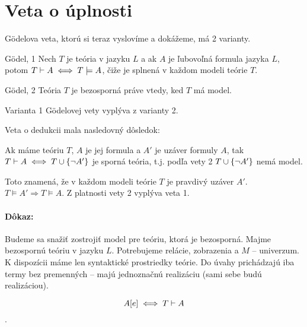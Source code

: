 \section{Veta o úplnosti}
\startFIXME

G\"odelova veta, ktorú si teraz vyslovíme a dokážeme, má 2 varianty.

\begin{veta}{G\"odel, 1}
    Nech $T$ je teória v jazyku $L$ a ak $A$ je
    ľubovoľná formula jazyka $L$, potom $T \vdash A \iff T \models A$,
    čiže je splnená v každom modeli teórie $T$.
\end{veta}

\begin{veta}{G\"odel, 2}
    Teória $T$ je bezosporná práve vtedy, ked $T$ má model.
\end{veta}

\begin{poznamka}
    Varianta 1 G\"odelovej vety vyplýva z varianty 2.

    Veta o dedukcii mala nasledovný dôsledok:

    Ak máme teóriu $T$, $A$ je jej formula a $A'$ je uzáver formuly $A$,
    tak $T \vdash A \iff T \cup \{ \neg A' \}$ je sporná teória,
    t.j. podľa vety 2 $T \cup \{ \neg A' \}$ nemá model.

    Toto znamená, že v každom modeli teórie $T$ je pravdivý uzáver $A'$.
    $T \models A' \Rightarrow T \models A$. Z platnosti vety 2 vyplýva veta 1.
\end{poznamka}

\paragraph{Dôkaz:}

\par Budeme sa snažiť zostrojiť model pre teóriu, ktorá je bezosporná. Majme
bezospornú teóriu v jazyku $L$. Potrebujeme relácie, zobrazenia a $M$ --
univerzum. K dispozícii máme len syntaktické prostriedky teórie. Do úvahy
prichádzajú iba termy bez premenných -- majú jednoznačnú realizáciu (sami sebe
budú realizáciou).

$$A[e] \iff T \vdash A $$.

